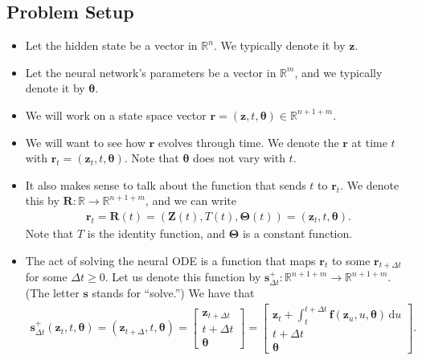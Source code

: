 \documentclass[10pt]{article}
\newcommand{\dee}{\mathrm{d}}
\newcommand{\ve}[1]{\mathbf{#1}}
\newcommand{\ves}[1]{\boldsymbol{#1}}
\newcommand{\Real}{\mathbb{R}}
\begin{document}
\subsection{Problem Setup}

\begin{itemize}
  \item Let the hidden state be a vector in $\Real^n$. We typically denote it by $\ve{z}$.
  
  \item Let the neural network's parameters be a vector in $\Real^m$, and we typically denote it by $\ves{\theta}$.
  
  \item We will work on a state space vector $\ve{r} = (\ve{z}, t, \ves{\theta}) \in \Real^{n+1+m}$.
  
  \item We will want to see how $\ve{r}$ evolves through time. We denote the $\ve{r}$ at time $t$ with $\ve{r}_t = (\ve{z}_t, t, \ves{\theta})$. Note that $\ves{\theta}$ does not vary with $t$.
  
  \item It also makes sense to talk about the function that sends $t$ to $\ve{r}_t$. We denote this by $\ve{R}: \Real \rightarrow \Real^{n+1+m}$, and we can write
  \begin{align*}
    \ve{r}_t = \ve{R}(t) = (\ve{Z}(t), T(t), \ves{\Theta}(t)) = (\ve{z}_t, t, \ves{\theta}).
  \end{align*}
  Note that $T$ is the identity function, and $\ves{\Theta}$ is a constant function.

  \item The act of solving the neural ODE is a function that maps $\ve{r}_{t}$ to some $\ve{r}_{t + \Delta t}$ for some $\Delta t \geq 0$. Let us denote this function by $\ve{s}_{\Delta t}^+: \Real^{n+1+m} \rightarrow \Real^{n+1+m}.$ (The letter $\ve{s}$ stands for ``solve.'') We have that
  \begin{align*}
    \ve{s}^+_{\Delta t}(\ve{z}_t, t, \ves{\theta})     
    = (\ve{z}_{t+\Delta}, t, \ves{\theta})
    = \begin{bmatrix}
      \ve{z}_{t + \Delta t} \\
      t + \Delta t \\
      \ves{\theta}
    \end{bmatrix}
    = \begin{bmatrix}
      \ve{z}_t + \int_{t}^{t+\Delta t} \ve{f}(\ve{z}_u, u, \ves{\theta})\, \dee u \\
      t + \Delta t \\
      \ves{\theta}
    \end{bmatrix}.
  \end{align*}


\end{itemize}
\end{document}
